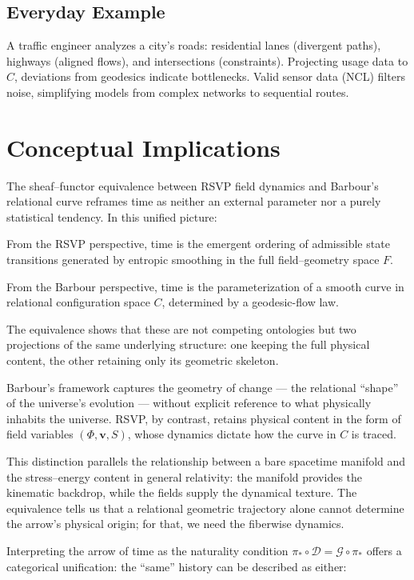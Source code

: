 \documentclass[11pt]{article}
\theoremstyle{plain}
\theoremstyle{definition}
\begin{document}
\subsection{Everyday Example}
A traffic engineer analyzes a city's roads: residential lanes (divergent paths), highways (aligned flows), and intersections (constraints). Projecting usage data to $C$, deviations from geodesics indicate bottlenecks. Valid sensor data (NCL) filters noise, simplifying models from complex networks to sequential routes.

\section{Conceptual Implications}

The sheaf–functor equivalence between RSVP field dynamics and Barbour’s relational curve reframes time as neither an external parameter nor a purely statistical tendency. In this unified picture:

From the RSVP perspective, time is the emergent ordering of admissible state transitions generated by entropic smoothing in the full field–geometry space $F$.

From the Barbour perspective, time is the parameterization of a smooth curve in relational configuration space $C$, determined by a geodesic-flow law.

The equivalence shows that these are not competing ontologies but two projections of the same underlying structure: one keeping the full physical content, the other retaining only its geometric skeleton.

Barbour’s framework captures the geometry of change — the relational “shape” of the universe’s evolution — without explicit reference to what physically inhabits the universe. RSVP, by contrast, retains physical content in the form of field variables $(\Phi, \mathbf{v}, S)$, whose dynamics dictate how the curve in $C$ is traced.

This distinction parallels the relationship between a bare spacetime manifold and the stress–energy content in general relativity: the manifold provides the kinematic backdrop, while the fields supply the dynamical texture. The equivalence tells us that a relational geometric trajectory alone cannot determine the arrow’s physical origin; for that, we need the fiberwise dynamics.

Interpreting the arrow of time as the naturality condition
$\pi_* \circ \mathcal{D} = \mathcal{G} \circ \pi_*$
offers a categorical unification: the “same” history can be described as either:
\end{document}
